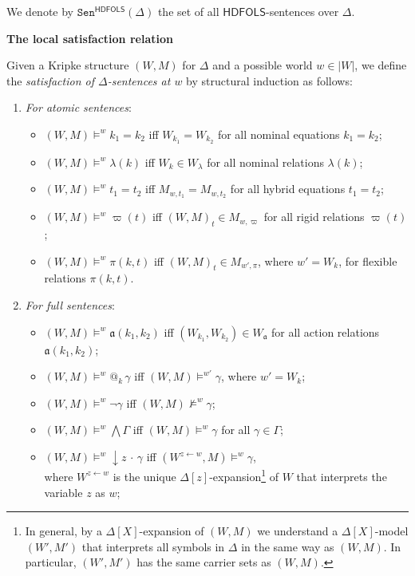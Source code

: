 \documentclass[a4paper,UKenglish,cleveref, autoref]{lipics-v2019}
\makeatletter
\newcommand{\HDFOLS}{{\mathsf{HDFOLS}}}
\newcommand{\Sen}{\mathtt{Sen}}
\renewcommand{\models}{\vDash}
\newcommand{\nmodels}{\nvDash}
\newcommand{\act}{\mathfrak{a}}
\newcommand{\assign}{\leftarrow}
\newcommand{\at}[1]{@_{#1}\,}
\newcommand{\store}[1]{{\downarrow}#1\,{\cdot}\,}
\newcommand{\minisec}[1]{%
  \par\addvspace{\smallskipamount}\noindent%
  \textbf{\sffamily #1}\enspace%
}
\makeatother
\begin{document}
We denote by \(\Sen^{\HDFOLS}(\Delta)\) the set of all \(\HDFOLS\)-sentences over \(\Delta\).

\minisec{The local satisfaction relation}
Given a Kripke structure \((W, M)\) for \(\Delta\) and a possible world \(w \in |W|\), we define the \emph{satisfaction of \(\Delta\)-sentences at \(w\)} by structural induction as follows:
\begin{enumerate}

\item \emph{For atomic sentences}:
  \begin{itemize}

  \item  $(W,M)\models^w k_1 = k_2$ iff $W_{k_1}=W_{k_2}$ for all nominal equations $k_1=k_2$;

  \item \((W, M) \models^{w} \lambda(k)\) iff \(W_{k} \in W_{\lambda}\) for all nominal relations \(\lambda(k)\);

  \item $(W,M)\models^w t_1 = t_2$ iff $M_{w,t_1} = M_{w,t_2}$ for all hybrid equations $t_1=t_2$;

  \item $(W,M)\models^w\varpi(t)$ iff $(W,M)_t\in M_{w,\varpi}$ for all rigid relations $\varpi(t)$;

  \item $(W,M)\models^w\pi(k,t)$ iff $(W,M)_t\in M_{w',\pi}$, where \(w' = W_{k}\), for flexible relations $\pi(k,t)$.

  \end{itemize}

\item \emph{For full sentences}:
  \begin{itemize}

  \item $(W,M)\models^w \act(k_{1}, k_{2})$ iff $(W_{k_{1}}, W_{k_{2}}) \in W_\act$ for all action relations $\act(k_{1}, k_{2})$;

  \item $(W,M)\models^w \at{k} \gamma$ iff $(W,M)\models^{w'} \gamma$, where \(w' = W_{k}\);

  \item $(W,M)\models^w \neg \gamma$ iff \((W, M) \nmodels^{w} \gamma\);

  \item $(W,M)\models^w \bigwedge \Gamma$ iff $(W,M)\models^w \gamma$ for all $\gamma\in\Gamma$; 

  \item $(W,M)\models^w \store{z}{\gamma}$ iff $(W^{z\leftarrow w},M)\models^w \gamma$, \\
    where $W^{z \assign w}$ is the unique \(\Delta[z]\)-expansion\footnote{In general, by a \(\Delta[X]\)-expansion of \((W, M)\) we understand a \(\Delta[X]\)-model \((W', M')\) that interprets all symbols in \(\Delta\) in the same way as \((W, M)\). In particular, \((W', M')\) has the same carrier sets as \((W, M)\).} of $W$ that interprets the variable $z$ as $w$;


\end{itemize}
\end{enumerate}
\end{document}
